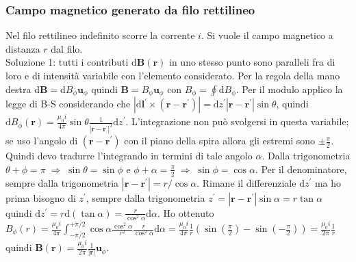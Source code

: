 \documentclass[11pt,a4paper]{article}
\newcommand{\de}{\mathrm d}
\begin{document}
\subsubsection{Campo magnetico generato da filo rettilineo}
Nel filo rettilineo indefinito scorre la corrente $i$. Si vuole il campo magnetico a distanza $r$ dal filo.\\
Soluzione 1: tutti i contributi $\de\mathbf B(\mathbf r)$ in uno stesso punto sono paralleli fra di loro e di intensità variabile con l'elemento considerato. Per la regola della mano destra $\de\mathbf B = \de B_\phi \mathbf u_\phi$ quindi $\mathbf B = B_\phi \mathbf u_\phi$ con $B_\phi = \oint \de B_\phi$. Per il modulo applico la legge di B-S considerando che $|\de\mathbf l^\prime \times (\mathbf r - \mathbf r^\prime)| = \de z^\prime |\mathbf r - \mathbf r^\prime| \sin\theta$, quindi $\de B_\phi(\mathbf r) = \frac{\mu_0 i}{4\pi} \sin\theta \frac1{|\mathbf r - \mathbf r^\prime|^2} \de z^\prime$. L'integrazione non può svolgersi in questa variabile; se uso l'angolo di $(\mathbf r - \mathbf r^\prime)$ con il piano della spira allora gli estremi sono $\pm \frac\pi 2$. Quindi devo tradurre l'integrando in termini di tale angolo $\alpha$. Dalla trigonometria $\theta + \phi  = \pi \;\Longrightarrow\; \sin\theta = \sin\phi$ e $\phi + \alpha = \frac\pi 2 \;\Longrightarrow\; \sin\phi = \cos\alpha$. Per il denominatore, sempre dalla trigonometria $|\mathbf r - \mathbf r^\prime| = r/\cos\alpha$. Rimane il differenziale $\de z^\prime$ ma ho prima bisogno di $z^\prime$, sempre dalla trigonometria $z^\prime = |\mathbf r - \mathbf r^\prime| \sin\alpha = r \tan\alpha$ quindi $\de z^\prime = r \de(\tan\alpha) = \frac{r}{\cos^2\alpha} \de\alpha$. Ho ottenuto $B_\phi(r) = \frac{\mu_0 i}{4\pi} \int_{-\pi/2}^{+\pi/2} \cos\alpha \frac{\cos^2\alpha}{r^2} \frac{r}{\cos^2\alpha} \de\alpha = \frac{\mu_0 i}{4\pi} \frac1r (\sin(\frac\pi 2) - \sin(-\frac\pi 2)) = \frac{\mu_0 i}{2\pi} \frac1r$ quindi $\mathbf B(\mathbf r) = \frac{\mu_0 i}{2\pi} \frac1{|\mathbf r|} \mathbf u_\phi$.
\end{document}
